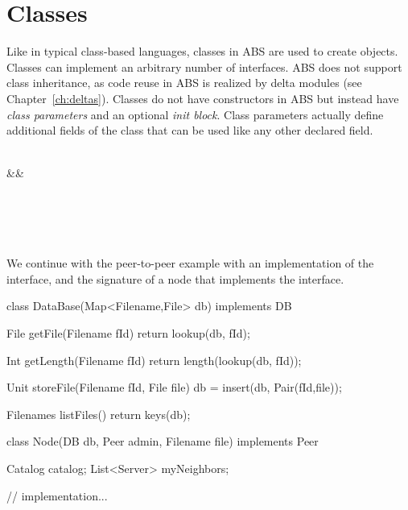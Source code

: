 \section{Classes}
Like in typical class-based languages, classes in ABS 
are used to create objects. 
Classes can implement an arbitrary number of interfaces.
ABS does not support class inheritance, as code reuse in ABS is realized by delta modules (see Chapter~\ref{ch:deltas}).
Classes do not have constructors in ABS but instead have
\emph{class parameters} and an optional \emph{init block}.
Class parameters actually define additional fields of the 
class that can be used like any other declared field.
\newpage

\begin{abssyntax}
      {}\ \ \  
\\&&
                  \TRS{\{}\ \ \ \ \TRS{\}}\\  
  {}\ \\
      {}\ \ \ \TRS{;}\\
   {}\ \\
       {}\ \ \TRS{(}  \TRS{)}\ 
\end{abssyntax}

%
%

We continue with the peer-to-peer example with an implementation of
the  interface, and the signature of a node that
implements the  interface.
%

\begin{absexample}
class DataBase(Map<Filename,File> db) implements DB {
  File getFile(Filename fId) {
      return lookup(db, fId);
  }
  
  Int getLength(Filename fId){
      return length(lookup(db, fId));
  }
  
  Unit storeFile(Filename fId, File file) {
      db = insert(db, Pair(fId,file));
  }
  
  Filenames listFiles() {
      return keys(db);
  }
}

class Node(DB db, Peer admin, Filename file) implements Peer {
  Catalog catalog;
  List<Server> myNeighbors;

  // implementation...
}
\end{absexample}

